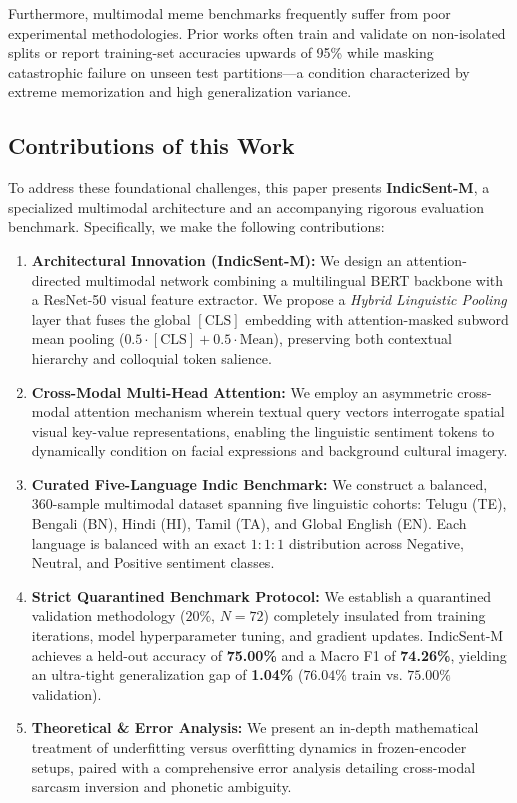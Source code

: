 \documentclass[10pt,journal,compsoc]{IEEEtran}
\begin{document}
Furthermore, multimodal meme benchmarks frequently suffer from poor experimental methodologies. Prior works often train and validate on non-isolated splits or report training-set accuracies upwards of 95\% while masking catastrophic failure on unseen test partitions—a condition characterized by extreme memorization and high generalization variance.

\subsection{Contributions of this Work}
To address these foundational challenges, this paper presents \textbf{IndicSent-M}, a specialized multimodal architecture and an accompanying rigorous evaluation benchmark. Specifically, we make the following contributions:
\begin{enumerate}
    \item \textbf{Architectural Innovation (IndicSent-M):} We design an attention-directed multimodal network combining a multilingual BERT backbone with a ResNet-50 visual feature extractor. We propose a \textit{Hybrid Linguistic Pooling} layer that fuses the global $[\text{CLS}]$ embedding with attention-masked subword mean pooling ($0.5 \cdot [\text{CLS}] + 0.5 \cdot \text{Mean}$), preserving both contextual hierarchy and colloquial token salience.
    \item \textbf{Cross-Modal Multi-Head Attention:} We employ an asymmetric cross-modal attention mechanism wherein textual query vectors interrogate spatial visual key-value representations, enabling the linguistic sentiment tokens to dynamically condition on facial expressions and background cultural imagery.
    \item \textbf{Curated Five-Language Indic Benchmark:} We construct a balanced, 360-sample multimodal dataset spanning five linguistic cohorts: Telugu (TE), Bengali (BN), Hindi (HI), Tamil (TA), and Global English (EN). Each language is balanced with an exact $1:1:1$ distribution across Negative, Neutral, and Positive sentiment classes.
    \item \textbf{Strict Quarantined Benchmark Protocol:} We establish a quarantined validation methodology ($20\%$, $N=72$) completely insulated from training iterations, model hyperparameter tuning, and gradient updates. IndicSent-M achieves a held-out accuracy of \textbf{75.00\%} and a Macro F1 of \textbf{74.26\%}, yielding an ultra-tight generalization gap of \textbf{1.04\%} ($76.04\%$ train vs. $75.00\%$ validation).
    \item \textbf{Theoretical \& Error Analysis:} We present an in-depth mathematical treatment of underfitting versus overfitting dynamics in frozen-encoder setups, paired with a comprehensive error analysis detailing cross-modal sarcasm inversion and phonetic ambiguity.
\end{enumerate}
\end{document}

